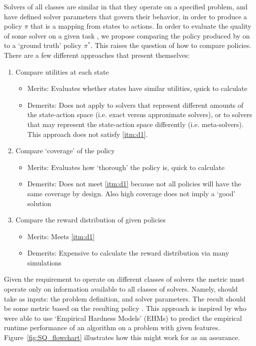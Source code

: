     Solvers of all classes are similar in that they operate on a specified problem, and have defined solver parameters that govern their behavior, in order to produce a policy $\pi$ that is a mapping from states to actions. In order to evaluate the quality of some solver on a given task \task, we propose comparing the policy \policy{} produced by \solver{} on \task{} to a `ground truth' policy $\pi^*$. This raises the question of how to compare policies. There are a few different approaches that present themselves:

    \begin{enumerate}
        \item Compare utilities at each state \label{itm:i1}
        \begin{itemize}
            \item Merits: Evaluates whether states have similar utilities, quick to calculate
            \item Demerits: Does not apply to solvers that represent different amounts of the state-action space (i.e. exact versus approximate solvers), or to solvers that may represent the state-action space differently (i.e. meta-solvers). This approach does not satisfy \ref{itm:d1}.
        \end{itemize} 
        \item Compare `coverage' of the policy \label{itm:i2}
        \begin{itemize}
            \item Merits: Evaluates how `thorough' the policy is, quick to calculate
            \item Demerits: Does not meet \ref{itm:d1} because not all policies will have the same coverage by design. Also high coverage does not imply a `good' solution
        \end{itemize}
        \item Compare the reward distribution of given policies \label{itm:i3}
        \begin{itemize}
            \item Merits: Meets \ref{itm:d1}
            \item Demerits: Expensive to calculate the reward distribution via many simulations
        \end{itemize}
    \end{enumerate}
    
    Given the requirement to operate on different classes of solvers the \xQ{} metric must operate only on information available to all classes of solvers. Namely, \xQ{} should take as inputs: the problem definition, and solver parameters. The result should be some metric based on the resulting policy \policy. This approach is inspired by \cite{Leyton-Brown2009-yr} who were able to use `Empirical Hardness Models' (EHMs) to predict the empirical runtime performance of an algorithm on a problem with given features. Figure~\ref{fig:SQ_flowchart} illustrates how this might work for \xQ{} as an assurance.

